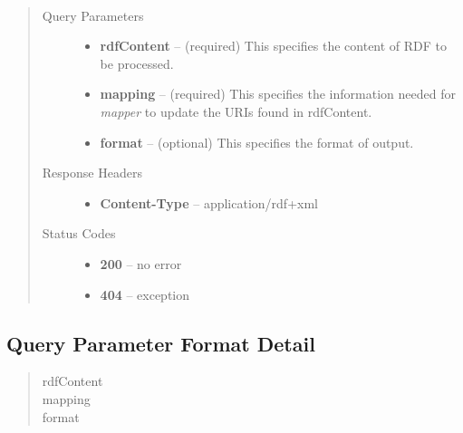 \documentclass[letterpaper,10pt,english]{sphinxmanual}
\begin{document}
\begin{fulllineitems}
\label{user_guide:post--mapper_?rdfContent, mapping, format_}~\begin{quote}\begin{description}
\item[{Query Parameters}] \leavevmode\begin{itemize}
\item {} 
\textbf{rdfContent} -- (required) This specifies the content of RDF to be processed.

\item {} 
\textbf{mapping} -- (required) This specifies the information needed for \emph{mapper} to update the URIs found in rdfContent.

\item {} 
\textbf{format} -- (optional) This specifies the format of output.

\end{itemize}

\item[{Response Headers}] \leavevmode\begin{itemize}
\item {} 
\textbf{Content-Type} -- application/rdf+xml

\end{itemize}

\item[{Status Codes}] \leavevmode\begin{itemize}
\item {} 
\textbf{200} -- no error

\item {} 
\textbf{404} -- exception

\end{itemize}

\end{description}\end{quote}

\end{fulllineitems}



\subsection{Query Parameter Format Detail}
\label{user_guide:id1}\begin{quote}\begin{description}
\item[{rdfContent}] \leavevmode
\item[{mapping}] \leavevmode
\item[{format}] \leavevmode
\end{description}\end{quote}
\end{document}
